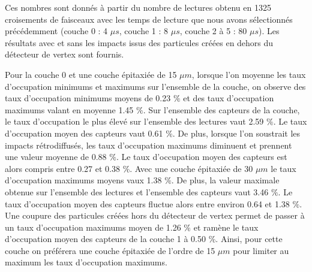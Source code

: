    \medskip
   
   Ces nombres sont donn\'es \`a partir du nombre de lectures obtenu en 1325 croisements de faisceaux avec les temps de lecture que nous avons s\'electionn\'es pr\'ec\'edemment (couche 0 : 4 $\mu s$, couche 1 : 8 $\mu s$, couche 2 \`a 5 : 80 $\mu s$). Les résultats avec et sans les impacts issus des particules cr\'e\'ees en dehors du d\'etecteur de vertex sont fournis.
   
   \medskip

   Pour la couche 0 et une couche \'epitaxi\'ee de 15 $\mu m$, lorsque l'on moyenne les taux d'occupation minimums et maximums sur l'ensemble de la couche, on observe des taux d'occupation minimums moyens de 0.23 $\%$ et des taux d'occupation maximums valant en moyenne 1.45 $\%$. Sur l'ensemble des capteurs de la couche, le taux d'occupation le plus \'elev\'e sur l'ensemble des lectures vaut 2.59 $\%$. Le taux d'occupation moyen des capteurs vaut 0.61 $\%$. De plus, lorsque l'on soustrait les impacts r\'etrodiffus\'es, les taux d'occupation maximums diminuent et prennent une valeur moyenne de 0.88 $\%$. Le taux d'occupation moyen des capteurs est alors compris entre 0.27 et 0.38 $\%$. Avec une couche \'epitaxi\'ee de 30 $\mu m$ le taux d'occupation maximums moyens vaux 1.38 $\%$. De plus, la valeur maximale obtenue sur l'ensemble des lectures et l'ensemble des capteurs vaut 3.46 $\%$. Le taux d'occupation moyen des capteurs fluctue alors entre environ  0.64 et 1.38 $\%$. Une coupure des particules cr\'e\'ees hors du d\'etecteur de vertex permet de passer \`a un taux d'occupation maximums moyen de 1.26 $\%$ et ram\`ene le taux d'occupation moyen des capteurs de la couche 1 \`a 0.50 $\%$. Ainsi, pour cette couche on pr\'ef\'erera une couche \'epitaxi\'ee de l'ordre de 15 $\mu m$ pour limiter au maximum les taux d'occupation maximums. 
   
   \medskip

